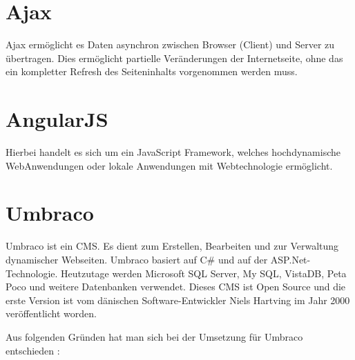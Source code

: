\section{Ajax}

Ajax ermöglicht es Daten asynchron zwischen Browser (Client) und Server zu übertragen. Dies ermöglicht partielle Veränderungen der Internetseite, ohne das ein kompletter Refresh des Seiteninhalts vorgenommen werden muss.

\section{AngularJS}

Hierbei handelt es sich um ein JavaScript Framework, welches hochdynamische WebAnwendungen oder lokale Anwendungen mit Webtechnologie ermöglicht. 

\section{Umbraco}


Umbraco ist ein \ac{CMS}. Es dient zum Erstellen, Bearbeiten und zur Verwaltung dynamischer Webseiten. Umbraco basiert auf C\#  und auf der ASP.Net-Technologie. Heutzutage werden Microsoft SQL Server, My SQL, VistaDB, Peta Poco und weitere Datenbanken verwendet. Dieses CMS ist Open Source und die erste Version ist vom dänischen Software-Entwickler Niels Hartving im Jahr 2000 veröffentlicht worden. 

Aus folgenden Gründen hat man sich bei der Umsetzung für Umbraco entschieden \cite[S. 12]{bentley:1999}:

